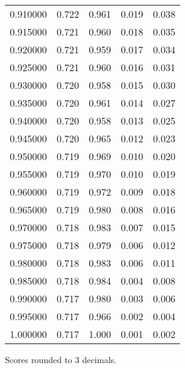 \begin{table}[htbp]
\begin{tabular}{lllll}
0.910000 & 0.722 & 0.961 & 0.019 & 0.038 \\
0.915000 & 0.721 & 0.960 & 0.018 & 0.035 \\
0.920000 & 0.721 & 0.959 & 0.017 & 0.034 \\
0.925000 & 0.721 & 0.960 & 0.016 & 0.031 \\
0.930000 & 0.720 & 0.958 & 0.015 & 0.030 \\
0.935000 & 0.720 & 0.961 & 0.014 & 0.027 \\
0.940000 & 0.720 & 0.958 & 0.013 & 0.025 \\
0.945000 & 0.720 & 0.965 & 0.012 & 0.023 \\
0.950000 & 0.719 & 0.969 & 0.010 & 0.020 \\
0.955000 & 0.719 & 0.970 & 0.010 & 0.019 \\
0.960000 & 0.719 & 0.972 & 0.009 & 0.018 \\
0.965000 & 0.719 & 0.980 & 0.008 & 0.016 \\
0.970000 & 0.718 & 0.983 & 0.007 & 0.015 \\
0.975000 & 0.718 & 0.979 & 0.006 & 0.012 \\
0.980000 & 0.718 & 0.983 & 0.006 & 0.011 \\
0.985000 & 0.718 & 0.984 & 0.004 & 0.008 \\
0.990000 & 0.717 & 0.980 & 0.003 & 0.006 \\
0.995000 & 0.717 & 0.966 & 0.002 & 0.004 \\
1.000000 & 0.717 & 1.000 & 0.001 & 0.002 \\
\bottomrule
\end{tabular}

\begin{tablenotes}[flushleft]
\item \small{Scores rounded to 3 decimals.}
\end{tablenotes}
\end{table}